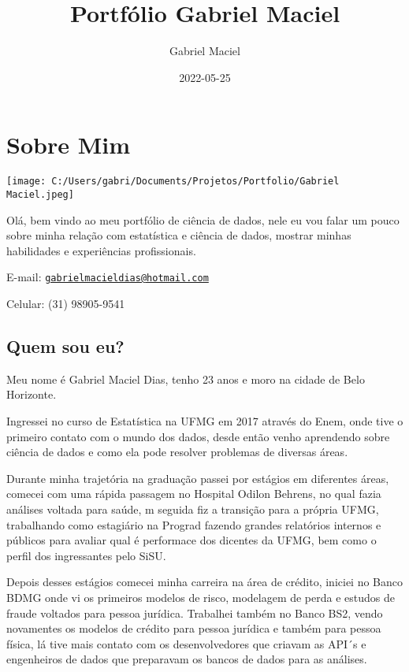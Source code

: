 \documentclass[
]{book}
\title{Portfólio Gabriel Maciel}
\author{Gabriel Maciel}
\date{2022-05-25}
\begin{document}
\maketitle

{
\setcounter{tocdepth}{1}
\tableofcontents
}
\hypertarget{sobre-mim}{%
\chapter{Sobre Mim}\label{sobre-mim}}

\texttt{[image: C:/Users/gabri/Documents/Projetos/Portfolio/Gabriel Maciel.jpeg]}

Olá, bem vindo ao meu portfólio de ciência de dados, nele eu vou falar um pouco sobre minha relação com estatística e ciência de dados, mostrar minhas habilidades e experiências profissionais.

E-mail: \href{mailto:gabrielmacieldias@hotmail.com}{\nolinkurl{gabrielmacieldias@hotmail.com}}

Celular: (31) 98905-9541

\hypertarget{quem-sou-eu}{%
\section{Quem sou eu?}\label{quem-sou-eu}}

Meu nome é Gabriel Maciel Dias, tenho 23 anos e moro na cidade de Belo Horizonte.

Ingressei no curso de Estatística na UFMG em 2017 através do Enem, onde tive o primeiro contato com o mundo dos dados, desde então venho aprendendo sobre ciência de dados e como ela pode resolver problemas de diversas áreas.

Durante minha trajetória na graduação passei por estágios em diferentes áreas, comecei com uma rápida passagem no Hospital Odilon Behrens, no qual fazia análises voltada para saúde, m seguida fiz a transição para a própria UFMG, trabalhando como estagiário na Prograd fazendo grandes relatórios internos e públicos para avaliar qual é performace dos dicentes da UFMG, bem como o perfil dos ingressantes pelo SiSU.

Depois desses estágios comecei minha carreira na área de crédito, iniciei no Banco BDMG onde vi os primeiros modelos de risco, modelagem de perda e estudos de fraude voltados para pessoa jurídica. Trabalhei também no Banco BS2, vendo novamentes os modelos de crédito para pessoa jurídica e também para pessoa física, lá tive mais contato com os desenvolvedores que criavam as API´s e engenheiros de dados que preparavam os bancos de dados para as análises.
\end{document}
